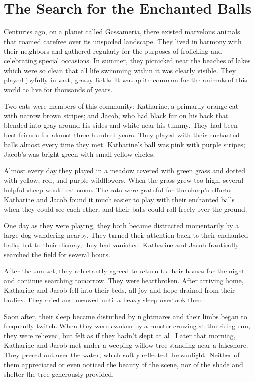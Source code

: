 \chapter{The Search for the Enchanted Balls}

Centuries ago, on a planet called Gossameria, there existed marvelous animals that roamed carefree over its unspoiled landscape. They lived in harmony with their neighbors and gathered regularly for the purposes of frolicking and celebrating special occasions. In summer, they picnicked near the beaches of lakes which were so clean that all life swimming within it was clearly visible. They played joyfully in vast, grassy fields. It was quite common for the animals of this world to live for thousands of years.

Two cats were members of this community: Katharine, a primarily orange cat with narrow brown stripes; and Jacob, who had black fur on his back that blended into gray around his sides and white near his tummy. They had been best friends for almost three hundred years. They played with their enchanted balls almost every time they met. Katharine's ball was pink with purple stripes; Jacob's was bright green with small yellow circles.

Almost every day they played in a meadow covered with green grass and dotted with yellow, red, and purple wildflowers. When the grass grew too high, several helpful sheep would eat some. The cats were grateful for the sheep’s efforts; Katharine and Jacob found it much easier to play with their enchanted balls when they could see each other, and their balls could roll freely over the ground.

One day as they were playing, they both became distracted momentarily by a large dog wandering nearby. They turned their attention back to their enchanted balls, but to their dismay, they had vanished. Katharine and Jacob frantically searched the field for several hours.

After the sun set, they reluctantly agreed to return to their homes for the night and continue searching tomorrow. They were heartbroken. After arriving home, Katharine and Jacob fell into their beds, all joy and hope drained from their bodies. They cried and meowed until a heavy sleep overtook them.

Soon after, their sleep became disturbed by nightmares and their limbs began to frequently twitch. When they were awoken by a rooster crowing at the rising sun, they were relieved, but felt as if they hadn't slept at all. Later that morning, Katharine and Jacob met under a weeping willow tree standing near a lakeshore. They peered out over the water, which softly reflected the sunlight. Neither of them appreciated or even noticed the beauty of the scene, nor of the shade and shelter the tree generously provided.

